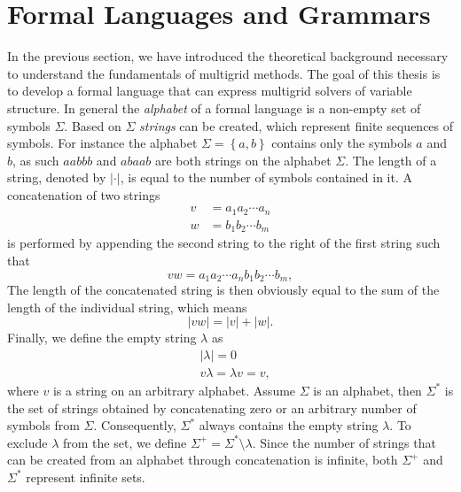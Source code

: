 \section{Formal Languages and Grammars}
In the previous section, we have introduced the theoretical background necessary to understand the fundamentals of multigrid methods.
The goal of this thesis is to develop a formal language that can express multigrid solvers of variable structure.
In general the \emph{alphabet} of a formal language is a non-empty set of symbols $\Sigma$.
Based on $\Sigma$ \emph{strings} can be created, which represent finite sequences of symbols.
For instance the alphabet $\Sigma = \left\{a, b\right\}$ contains only the symbols $a$ and $b$, as such $aabbb$ and $abaab$ are both strings on the alphabet $\Sigma$.
The length of a string, denoted by $|\cdot|$, is equal to the number of symbols contained in it. 
A concatenation of two strings 
\begin{equation}
	\begin{split}
		v & = a_1 a_2 \cdots a_n \\
		w & = b_1 b_2 \cdots b_m
	\end{split}
\end{equation}
is performed by appending the second string to the right of the first string such that
\begin{equation}
	vw = a_1 a_2 \cdots a_n b_1 b_2 \cdots b_m,
\end{equation}
The length of the concatenated string is then obviously equal to the sum of the length of the individual string, which means
\begin{equation}
|vw| = |v| + |w|.
\end{equation}
Finally, we define the empty string $\lambda$ as
\begin{equation}
	\begin{split}
		& |\lambda| = 0 \\
		& v \lambda = \lambda v = v,
	\end{split}
\end{equation}
where $v$ is a string on an arbitrary alphabet.
Assume $\Sigma$ is an alphabet, then $\Sigma^*$ is the set of strings obtained by concatenating zero or an arbitrary number of symbols from $\Sigma$.
Consequently, $\Sigma^*$ always contains the empty string $\lambda$.
To exclude $\lambda$ from the set, we define $\Sigma^+ = \Sigma^* \setminus \lambda$.
Since the number of strings that can be created from an alphabet through concatenation is infinite, both $\Sigma^+$ and $\Sigma^*$ represent infinite sets.
